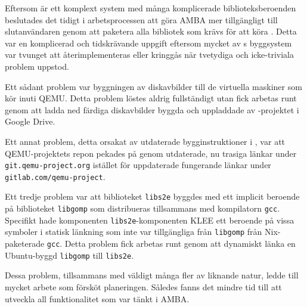 Eftersom \stoe{} är ett komplext system med många komplicerade
biblioteksberoenden beslutades det tidigt i arbetsprocessen att göra AMBA mer
tillgängligt till slutanvändaren genom att paketera alla bibliotek som krävs för
att köra \stoe{}. Detta var en komplicerad och tidskrävande uppgift eftersom
mycket av \stoe{}s byggsystem var tvunget att återimplementeras eller kringgås
när tvetydiga och icke-triviala problem uppstod.

Ett sådant problem var byggningen av diskavbilder till de virtuella maskiner som
\stoe{} kör inuti QEMU. Detta problem löstes aldrig fullständigt utan fick
arbetas runt genom att ladda ned färdiga diskavbilder byggda och uppladdade av
\stoe{}-projektet i Google Drive.

Ett annat problem, detta orsakat av utdaterade bygginstruktioner i \stoe{}, var
att QEMU-projektets repon pekades på genom utdaterade, nu trasiga länkar under
\texttt{git.qemu-project.org} istället för uppdaterade fungerande länkar under
\\\texttt{gitlab.com/qemu-project}.

Ett tredje problem var att biblioteket \texttt{libs2e} byggdes med ett implicit
beroende på biblioteket \texttt{libgomp} som distribueras tillsammans med
kompilatorn \texttt{gcc}. Specifikt hade komponenten \texttt{libs2e}-komponenten
KLEE ett beroende på vissa symboler i statisk länkning som inte var tillgängliga
från \texttt{libgomp} från Nix-paketerade \texttt{gcc}. Detta problem fick
arbetas runt genom att dynamiskt länka en Ubuntu-byggd \texttt{libgomp} till
\texttt{libs2e}.

Dessa problem, tillsammans med väldigt många fler av liknande natur, ledde till
mycket arbete som försköt planeringen. Således fanns det mindre tid till att
utveckla all funktionalitet som var tänkt i AMBA.
